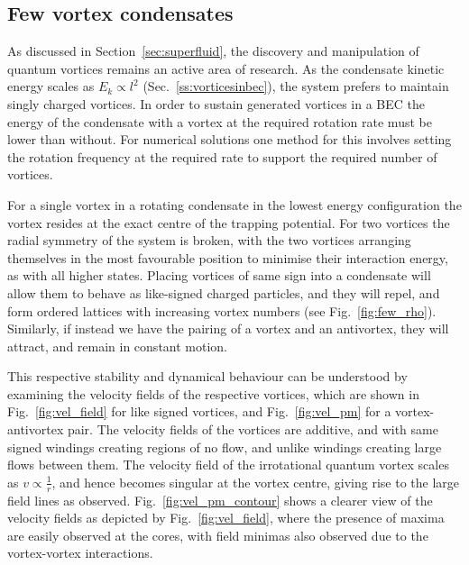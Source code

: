 \subsection{Few vortex condensates}

As discussed in Section~\ref{sec:superfluid}, the discovery and manipulation of quantum vortices remains an active area of research. As the condensate kinetic energy scales as $E_k \propto l^2$ (Sec.~\ref{ss:vorticesinbec}), the system prefers to maintain singly charged vortices. In order to sustain generated vortices in a BEC the energy of the condensate with a vortex at the required rotation rate must be lower than without. For numerical solutions one method for this involves setting the rotation frequency at the required rate to support the required number of vortices.

For a single vortex in a rotating condensate in the lowest energy configuration the vortex resides at the exact centre of the trapping potential. For two vortices the radial symmetry of the system is broken, with the two vortices arranging themselves in the most favourable position to minimise their interaction energy, as with all higher states. Placing vortices of same sign into a condensate will allow them to behave as like-signed charged particles, and they will repel, and form ordered lattices with increasing vortex numbers (see Fig.~\ref{fig:few_rho}). Similarly, if instead we have the pairing of a vortex and an antivortex, they will attract, and remain in constant motion.

This respective stability and dynamical behaviour can be understood by examining the velocity fields of the respective vortices, which are shown in Fig.~\ref{fig:vel_field} for like signed vortices, and Fig.~\ref{fig:vel_pm} for a vortex-antivortex pair. The velocity fields of the vortices are additive, and with same signed windings creating regions of no flow, and unlike windings creating large flows between them. The velocity field of the irrotational quantum vortex scales as $v \propto \frac{1}{r}$, and hence becomes singular at the vortex centre, giving rise to the large field lines as observed. Fig.~\ref{fig:vel_pm_contour} shows a clearer view of the velocity fields as depicted by Fig.~\ref{fig:vel_field}, where the presence of maxima are easily observed at the cores, with field minimas also observed due to the vortex-vortex interactions.

